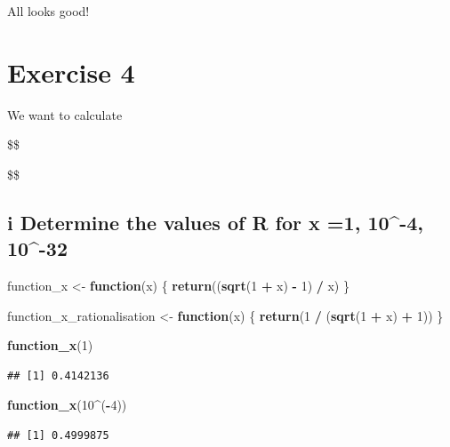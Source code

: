 \documentclass[
]{article}
\newenvironment{Shaded}{\begin{snugshade}}{\end{snugshade}}
\newcommand{\ControlFlowTok}[1]{\textcolor[rgb]{0.13,0.29,0.53}{\textbf{#1}}}
\newcommand{\DecValTok}[1]{\textcolor[rgb]{0.00,0.00,0.81}{#1}}
\newcommand{\FunctionTok}[1]{\textcolor[rgb]{0.13,0.29,0.53}{\textbf{#1}}}
\newcommand{\NormalTok}[1]{#1}
\newcommand{\OtherTok}[1]{\textcolor[rgb]{0.56,0.35,0.01}{#1}}
\newcommand{\SpecialCharTok}[1]{\textcolor[rgb]{0.81,0.36,0.00}{\textbf{#1}}}
\begin{document}
All looks good!

\section{Exercise 4}\label{exercise-4}

We want to calculate

\$\$


\$\$

\subsection{i Determine the values of R for x =1, 10\^{}-4,
10\^{}-32}\label{i-determine-the-values-of-r-for-x-1-10-4-10-32}

\begin{Shaded}
\begin{Highlighting}[]
\NormalTok{function\_x }\OtherTok{\textless{}{-}} \ControlFlowTok{function}\NormalTok{(x) \{}
  \FunctionTok{return}\NormalTok{((}\FunctionTok{sqrt}\NormalTok{(}\DecValTok{1} \SpecialCharTok{+}\NormalTok{ x) }\SpecialCharTok{{-}} \DecValTok{1}\NormalTok{) }\SpecialCharTok{/}\NormalTok{ x)}
\NormalTok{\}}

\NormalTok{function\_x\_rationalisation }\OtherTok{\textless{}{-}} \ControlFlowTok{function}\NormalTok{(x) \{}
  \FunctionTok{return}\NormalTok{(}\DecValTok{1} \SpecialCharTok{/}\NormalTok{ (}\FunctionTok{sqrt}\NormalTok{(}\DecValTok{1} \SpecialCharTok{+}\NormalTok{ x) }\SpecialCharTok{+} \DecValTok{1}\NormalTok{))}
\NormalTok{\}}


\FunctionTok{function\_x}\NormalTok{(}\DecValTok{1}\NormalTok{)}
\end{Highlighting}
\end{Shaded}

\begin{verbatim}
## [1] 0.4142136
\end{verbatim}

\begin{Shaded}
\begin{Highlighting}[]
\FunctionTok{function\_x}\NormalTok{(}\DecValTok{10}\SpecialCharTok{\^{}}\NormalTok{(}\SpecialCharTok{{-}}\DecValTok{4}\NormalTok{))}
\end{Highlighting}
\end{Shaded}

\begin{verbatim}
## [1] 0.4999875
\end{verbatim}
\end{document}
